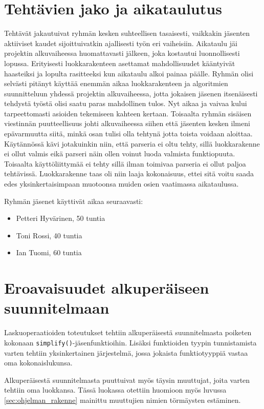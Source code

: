 \documentclass[10pt,a4paper]{article}
\begin{document}
\section{Tehtävien jako ja aikataulutus}
Tehtävät jakautuivat ryhmän kesken suhteellisen tasaisesti, vaikkakin jäsenten aktiiviset kaudet sijoittuivatkin ajallisesti työn eri vaiheisiin. Aikataulu jäi projektin alkuvaiheessa huomattavasti jälkeen, joka kostautui luonnollisesti lopussa. Erityisesti luokkarakenteen asettamat mahdollisuudet kääntyivät haasteiksi ja lopulta rasitteeksi kun aikataulu alkoi painaa päälle. Ryhmän olisi selvästi pitänyt käyttää enemmän aikaa luokkarakenteen ja algoritmien suunnitteluun yhdessä projektin alkuvaiheessa, jotta jokaisen jäsenen itsenäisesti tehdystä työstä olisi saatu paras mahdollinen tulos. Nyt aikaa ja vaivaa kului tarpeettomasti asioiden tekemiseen kahteen kertaan. Toisaalta ryhmän sisäisen viestinnän puutteellisuus johti alkuvaiheessa siihen että jäsenten kesken ilmeni epävarmuutta siitä, minkä osan tulisi olla tehtynä jotta toista voidaan aloittaa. Käytännössä kävi jotakuinkin niin, että parseria ei oltu tehty, sillä luokkarakenne ei ollut valmis eikä parseri näin ollen voinut luoda valmista funktiopuuta. Toisaalta käyttöliittymää ei tehty sillä ilman toimivaa parseria ei ollut paljoa tehtävissä. Luokkarakenne taas oli niin laaja kokonaisuus, ettei sitä voitu saada edes yksinkertaisimpaan muotoonsa muiden osien vaatimassa aikataulussa.

Ryhmän jäsenet käyttivät aikaa seuraavasti:
\begin{itemize}
	\item Petteri Hyvärinen, 50 tuntia
	\item Toni Rossi, 40 tuntia
	\item Ian Tuomi, 60 tuntia
\end{itemize}



\section{Eroavaisuudet alkuperäiseen suunnitelmaan}
Laskuoperaatioiden toteutukset tehtiin alkuperäisestä suunnitelmasta poiketen kokonaan \lstinline!simplify()!-jäsenfunktioihin. Lisäksi funktioiden tyypin tunnistamista varten tehtiin yksinkertainen järjestelmä, jossa jokaista funktiotyyppiä vastaa oma kokonaislukunsa.

Alkuperäisestä suunnitelmasta puuttuivat myös täysin muuttujat, joita varten tehtiin oma luokkansa. Tässä luokassa otettiin huomioon myös luvussa \ref{sec:ohjelman_rakenne} mainittu muuttujien nimien törmäysten estäminen.
\end{document}
